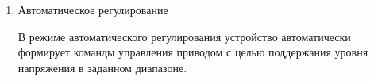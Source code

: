 
\color{black}

\begin{enumerate}[label=\arabic{section}.\arabic{subsection}.\arabic{enumi}, labelsep=4pt, leftmargin=0pt, itemindent=57pt, itemsep=0pt, parsep=5pt] %


\item Автоматическое регулирование

В режиме автоматического регулирования устройство автоматически формирует команды управления приводом с целью поддержания уровня напряжения в заданном диапазоне.


\end{enumerate}
